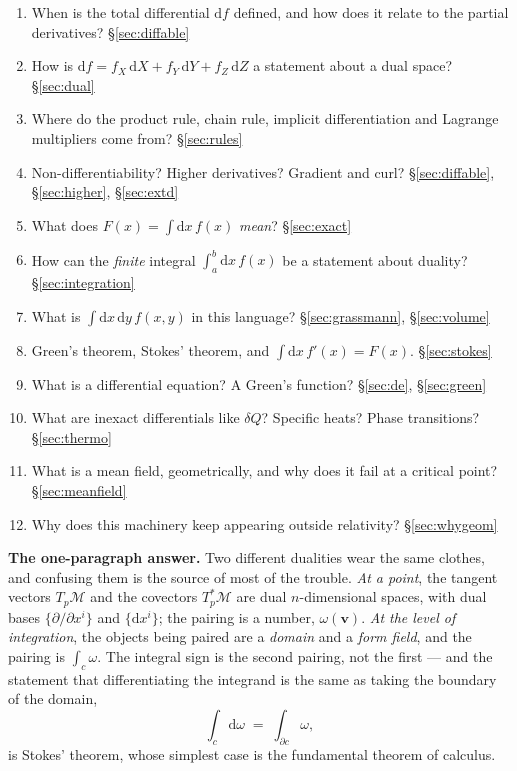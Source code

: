 \documentclass[10pt,a4paper]{article}
\newcommand{\dd}{\mathrm{d}}
\newcommand{\M}{\mathcal{M}}
\newcommand{\vv}{\mathbf{v}}
\theoremstyle{plain}
\theoremstyle{definition}
\numberwithin{equation}{section}
\begin{document}
\begin{keybox}
\small
\begin{enumerate}[leftmargin=2.1em,itemsep=1.5pt]
\item When is the total differential $\dd f$ defined, and how does it relate to the partial
      derivatives? \hfill \S\ref{sec:diffable}
\item How is $\dd f = f_X\,\dd X + f_Y\,\dd Y + f_Z\,\dd Z$ a statement about a dual space?
      \hfill \S\ref{sec:dual}
\item Where do the product rule, chain rule, implicit differentiation and Lagrange multipliers
      come from? \hfill \S\ref{sec:rules}
\item Non-differentiability? Higher derivatives? Gradient and curl?
      \hfill \S\ref{sec:diffable}, \S\ref{sec:higher}, \S\ref{sec:extd}
\item What does $F(x)=\int\dd x\,f(x)$ \emph{mean}? \hfill \S\ref{sec:exact}
\item How can the \emph{finite} integral $\int_a^b \dd x\, f(x)$ be a statement about duality?
      \hfill \S\ref{sec:integration}
\item What is $\int\dd x\,\dd y\,f(x,y)$ in this language?
      \hfill \S\ref{sec:grassmann}, \S\ref{sec:volume}
\item Green's theorem, Stokes' theorem, and $\int\dd x\,f'(x)=F(x)$. \hfill \S\ref{sec:stokes}
\item What is a differential equation? A Green's function?
      \hfill \S\ref{sec:de}, \S\ref{sec:green}
\item What are inexact differentials like $\delta Q$? Specific heats? Phase transitions?
      \hfill \S\ref{sec:thermo}
\item What is a mean field, geometrically, and why does it fail at a critical point?
      \hfill \S\ref{sec:meanfield}
\item Why does this machinery keep appearing outside relativity? \hfill \S\ref{sec:whygeom}
\end{enumerate}
\end{keybox}

\noindent\textbf{The one-paragraph answer.} Two different dualities wear the same clothes, and
confusing them is the source of most of the trouble. \emph{At a point}, the tangent vectors
$T_p\M$ and the covectors $T_p^*\M$ are dual $n$-dimensional spaces, with dual bases
$\{\partial/\partial x^i\}$ and $\{\dd x^i\}$; the pairing is a number, $\omega(\vv)$. \emph{At
the level of integration}, the objects being paired are a \emph{domain} and a \emph{form
field}, and the pairing is $\int_c\omega$. The integral sign is the second pairing, not the
first --- and the statement that differentiating the integrand is the same as taking the
boundary of the domain,
\[
\int_c \dd\omega \;=\; \int_{\partial c}\omega ,
\]
is Stokes' theorem, whose simplest case is the fundamental theorem of calculus.
\end{document}
